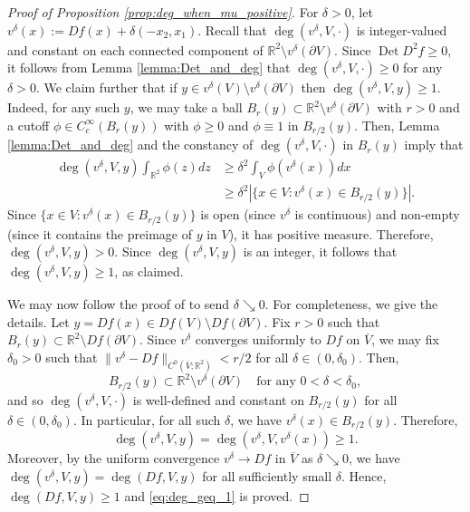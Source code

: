 \documentclass[12pt]{article}
\newcommand{\R}{\mathbb{R}}
\newcommand{\Det}{\operatorname{Det}}
\theoremstyle{plain}
\numberwithin{equation}{section}
\begin{document}
\begin{proof}[Proof of Proposition \ref{prop:deg_when_mu_positive}]
    For $\delta > 0$, let $v^\delta(x):=Df(x) + \delta(-x_2,x_1)$. Recall that $\deg(v^\delta, V,\cdot)$ is integer-valued and constant on each connected component of $\R^2 \setminus v^\delta(\partial V)$. Since $\Det D^2 f \geq 0$, it follows from Lemma \ref{lemma:Det_and_deg} that $\deg(v^\delta, V,\cdot) \geq 0$ for any $\delta > 0$. We claim further that if $y \in v^\delta(V) \setminus v^\delta(\partial V)$ then $\deg(v^\delta, V, y) \geq 1$. Indeed, for any such $y$, we may take a ball $B_r(y) \subset \R^2 \setminus v^\delta(\partial V)$ with $r > 0$ and a cutoff $\phi \in C^\infty_c(B_r(y))$ with $\phi \geq 0$ and $\phi \equiv 1$ in $B_{r/2}(y)$. Then, Lemma \ref{lemma:Det_and_deg} and the constancy of $\deg(v^\delta, V, \cdot)$ in $B_r(y)$ imply that
    \begin{align*}
        \deg(v^\delta, V,y) \int_{\R^2} \phi(z) dz &\geq \delta^2 \int_V \phi(v^\delta(x))dx\\
        &\geq \delta^2 |\{x \in V : v^\delta(x) \in B_{r/2}(y)\}|.
    \end{align*}
    Since $\{x \in V : v^\delta(x) \in B_{r/2}(y)\}$ is open (since $v^\delta$ is continuous) and non-empty (since it contains the preimage of $y$ in $V$), it has positive measure. Therefore, $\deg(v^\delta, V,y) > 0$. Since $\deg(v^\delta,V,y)$ is an integer, it follows that $\deg(v^\delta, V,y) \geq 1$, as claimed.
    
    We may now follow the proof of \cite[Corollary 5]{pakzad_24} to send $\delta \searrow 0$. For completeness, we give the details. Let $y = Df(x) \in Df(V) \setminus Df(\partial V)$. Fix $r > 0$ such that $B_r(y) \subset \R^2 \setminus Df(\partial V)$. Since $v^\delta$ converges uniformly to $Df$ on $\overline V$, we may fix $\delta_0>0$ such that $\|v^\delta - Df\|_{C^0(\overline V; \R^2)} < r/2$ for all $\delta \in (0,\delta_0)$. Then,
    \begin{equation*}
        B_{r/2}(y) \subset \R^2 \setminus v^\delta(\partial V) \quad \text{for any } 0 < \delta < \delta_0,
    \end{equation*}
    and so $\deg(v^\delta, V,\cdot)$ is well-defined and constant on $B_{r/2}(y)$ for all $\delta \in (0, \delta_0)$. In particular, for all such $\delta$, we have $v^\delta(x) \in B_{r/2}(y)$. Therefore,
    \begin{equation*}
        \deg(v^\delta, V,y) = \deg(v^\delta, V,v^\delta(x)) \geq 1.
    \end{equation*}
    Moreover, by the uniform convergence $v^\delta \to Df$ in $\overline V$ as $\delta \searrow 0$, we have $\deg(v^\delta, V,y) = \deg(Df, V,y)$ for all sufficiently small $\delta$. Hence, $\deg(Df,V,y) \geq 1$ and \eqref{eq:deg_geq_1} is proved.


\end{proof}
\end{document}
